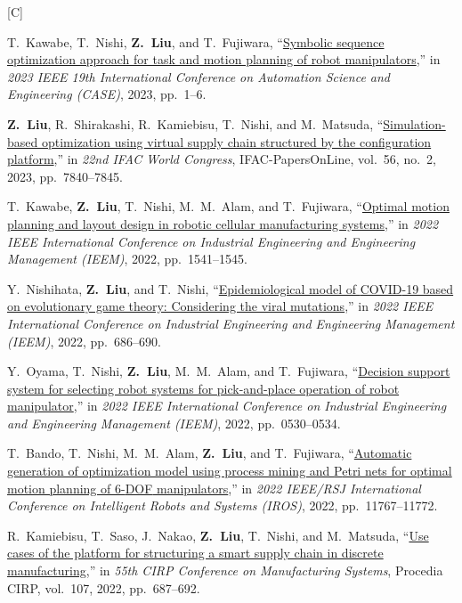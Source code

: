 \documentclass[11pt,a4paper]{article}
\newcommand{\doititle}[2]{\href{https://doi.org/#1}{#2}}
\newlength{\datecol}
\newcounter{pubno}
\newenvironment{publist}[1]{%
  \begin{list}{[#1\arabic{pubno}]}{%
    \usecounter{pubno}%
    \setlength{\leftmargin}{\datecol}%
    \setlength{\labelwidth}{\datecol}%
    \setlength{\labelsep}{0pt}%
    \setlength{\itemsep}{3pt}%
    \setlength{\parsep}{0pt}%
    \setlength{\topsep}{2pt}%
    \renewcommand{\makelabel}[1]{##1\hfil}}}%
  {\end{list}}
\begin{document}
\begin{publist}{C}
\item T.~Kawabe, T.~Nishi, \textbf{Z.~Liu}, and T.~Fujiwara, ``\doititle{10.1109/case56687.2023.10260452}{Symbolic sequence optimization approach for task and motion planning of robot manipulators},'' in \textit{2023 IEEE 19th International Conference on Automation Science and Engineering (CASE)}, 2023, pp.~1--6.
\item \textbf{Z.~Liu}, R.~Shirakashi, R.~Kamiebisu, T.~Nishi, and M.~Matsuda, ``\doititle{10.1016/j.ifacol.2023.10.1145}{Simulation-based optimization using virtual supply chain structured by the configuration platform},'' in \textit{22nd {IFAC} World Congress}, IFAC-PapersOnLine, vol.~56, no.~2, 2023, pp.~7840--7845.
\item T.~Kawabe, \textbf{Z.~Liu}, T.~Nishi, M.~M.~Alam, and T.~Fujiwara, ``\doititle{10.1109/ieem55944.2022.9989566}{Optimal motion planning and layout design in robotic cellular manufacturing systems},'' in \textit{2022 IEEE International Conference on Industrial Engineering and Engineering Management (IEEM)}, 2022, pp.~1541--1545.
\item Y.~Nishihata, \textbf{Z.~Liu}, and T.~Nishi, ``\doititle{10.1109/ieem55944.2022.9989989}{Epidemiological model of {COVID}-19 based on evolutionary game theory: Considering the viral mutations},'' in \textit{2022 IEEE International Conference on Industrial Engineering and Engineering Management (IEEM)}, 2022, pp.~686--690.
\item Y.~Oyama, T.~Nishi, \textbf{Z.~Liu}, M.~M.~Alam, and T.~Fujiwara, ``\doititle{10.1109/ieem55944.2022.9989780}{Decision support system for selecting robot systems for pick-and-place operation of robot manipulator},'' in \textit{2022 IEEE International Conference on Industrial Engineering and Engineering Management (IEEM)}, 2022, pp.~0530--0534.
\item T.~Bando, T.~Nishi, M.~M.~Alam, \textbf{Z.~Liu}, and T.~Fujiwara, ``\doititle{10.1109/iros47612.2022.9982201}{Automatic generation of optimization model using process mining and {P}etri nets for optimal motion planning of 6-{DOF} manipulators},'' in \textit{2022 IEEE/RSJ International Conference on Intelligent Robots and Systems (IROS)}, 2022, pp.~11767--11772.
\item R.~Kamiebisu, T.~Saso, J.~Nakao, \textbf{Z.~Liu}, T.~Nishi, and M.~Matsuda, ``\doititle{10.1016/j.procir.2022.05.046}{Use cases of the platform for structuring a smart supply chain in discrete manufacturing},'' in \textit{55th {CIRP} Conference on Manufacturing Systems}, Procedia CIRP, vol.~107, 2022, pp.~687--692.

\end{publist}
\end{document}
